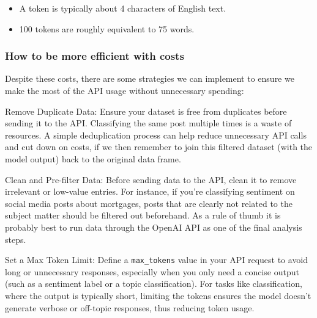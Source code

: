\documentclass[
  letterpaper,
  DIV=11,
  numbers=noendperiod]{scrreprt}
\begin{document}
\begin{tcolorbox}[enhanced jigsaw, colback=white, opacitybacktitle=0.6, coltitle=black, left=2mm, breakable, bottomtitle=1mm, toptitle=1mm, toprule=.15mm, colframe=quarto-callout-note-color-frame, titlerule=0mm, title=\textcolor{quarto-callout-note-color}{\faInfo}\hspace{0.5em}{Tokens to Words}, colbacktitle=quarto-callout-note-color!10!white, rightrule=.15mm, bottomrule=.15mm, arc=.35mm, opacityback=0, leftrule=.75mm]

\begin{itemize}
\item
  A token is typically about 4 characters of English text.
\item
  100 tokens are roughly equivalent to 75 words.
\end{itemize}

\end{tcolorbox}

\subsubsection{How to be more efficient with
costs}\label{how-to-be-more-efficient-with-costs}

Despite these costs, there are some strategies we can implement to
ensure we make the most of the API usage without unnecessary spending:

Remove Duplicate Data: Ensure your dataset is free from duplicates
before sending it to the API. Classifying the same post multiple times
is a waste of resources. A simple deduplication process can help reduce
unnecessary API calls and cut down on costs, if we then remember to join
this filtered dataset (with the model output) back to the original data
frame.

Clean and Pre-filter Data: Before sending data to the API, clean it to
remove irrelevant or low-value entries. For instance, if you're
classifying sentiment on social media posts about mortgages, posts that
are clearly not related to the subject matter should be filtered out
beforehand. As a rule of thumb it is probably best to run data through
the OpenAI API as one of the final analysis steps.

Set a Max Token Limit: Define a \texttt{max\_tokens} value in your API
request to avoid long or unnecessary responses, especially when you only
need a concise output (such as a sentiment label or a topic
classification). For tasks like classification, where the output is
typically short, limiting the tokens ensures the model doesn't generate
verbose or off-topic responses, thus reducing token usage.
\end{document}
